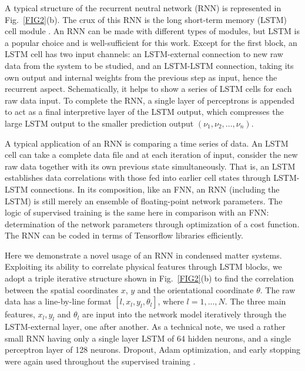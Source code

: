 A typical structure of the recurrent neutral network (RNN) is represented in Fig.~\ref{FIG2}(b). The crux of this RNN is the long short-term memory (LSTM) cell module \cite{lstm}. An RNN can be made with different types of modules, but LSTM is a popular choice and is well-sufficient for this work. Except for the first block, an LSTM cell has two input channels: an LSTM-external connection
to new raw data from the system to be studied,
and an LSTM-LSTM connection, taking its own output and internal weights from the previous step as input, hence the recurrent aspect. Schematically, it helps to show a series of LSTM cells for each raw data input. %
To complete the RNN, a single layer of perceptrons is appended to act as
a final interpretive layer of the LSTM output, which compresses the large LSTM output to the smaller prediction output $(\nu_1, \nu_2, ..., \nu_n)$.

A typical application of an RNN is comparing a time series of data.
An LSTM cell can take a complete data file and at each iteration of input, consider the new raw data together with its own previous state simultaneously. That is, an LSTM establishes data correlations with those fed into earlier cell states through LSTM-LSTM connections.
In its composition, like an FNN, an RNN (including the LSTM) is still merely an ensemble of floating-point network parameters.
The logic of supervised training is the same here in comparison with an FNN: determination of the network parameters through optimization of a cost function. The RNN can be coded in terms of Tensorflow libraries efficiently.


Here we demonstrate a novel usage of an RNN in condensed matter systems. Exploiting its ability to correlate physical features through LSTM blocks, we adopt a triple iterative structure shown in Fig.\ \ref{FIG2}(b) to find the correlation between the spatial coordinates $x$, $y$ and the orientational coordinate $\theta$. The raw data
has a line-by-line format $[l, x_l, y_l, \theta_l]$, where $l=1,..., N$. The three main features, $x_l, y_l$ and $\theta_l$ are input into the network model iteratively through the LSTM-external layer, one after another. As a technical note, we used a rather small RNN having only a single layer LSTM of 64 hidden neurons, and a single perceptron layer of 128 neurons. Dropout, Adam optimization, and early stopping were again used throughout the supervised training \cite{dropout,nntricks,adam}.


